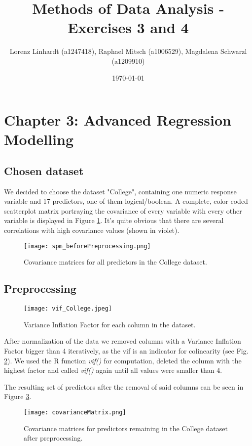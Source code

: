 \documentclass[a4paper]{article}
\title{Methods of Data Analysis - Exercises 3 and 4}
\author{Lorenz Linhardt (a1247418), Raphael Mitsch (a1006529), Magdalena Schwarzl (a1209910)}
\date{\today}
\begin{document}
\maketitle

\section{Chapter 3: Advanced Regression Modelling}
\label{sec:regression}

\subsection{Chosen dataset}

We decided to choose the dataset "College", containing one numeric response variable and 17 predictors, one of them logical/boolean. A complete, color-coded scatterplot matrix portraying the covariance of every variable with every other variable is displayed in Figure \ref{fig:college_covComparison}. It's quite obvious that there are several correlations with high covariance values (shown in violet).

\begin{figure}[H]
\centering
\texttt{[image: spm\_beforePreprocessing.png]}
\caption{\label{fig:college_covComparison}Covariance matrices for all predictors in the College dataset.}
\end{figure}

\subsection{Preprocessing}
\label{sec:preprocessing}
\begin{figure}[H]
\centering
\texttt{[image: vif\_College.jpeg]}
\caption{\label{fig:vifREG}Variance Inflation Factor for each column in the dataset.}
\end{figure}
\label{desc:colinearity}After normalization of the data we removed columns with a Variance Inflation Factor bigger than 4 iteratively, as the vif is an indicator for colinearity (see Fig. \ref{fig:vifREG}). We used the R function \textit{vif()} for computation, deleted the column with the highest factor and called \textit{vif()} again until all values were smaller than 4.

The resulting set of predictors after the removal of said columns can be seen in Figure \ref{fig:college_covComparison_afterPreproc}.

\begin{figure}[H]
\centering
\texttt{[image: covarianceMatrix.png]}
\caption{\label{fig:college_covComparison_afterPreproc}Covariance matrices for predictors remaining in the College dataset after preprocessing.}
\end{figure}
\end{document}
